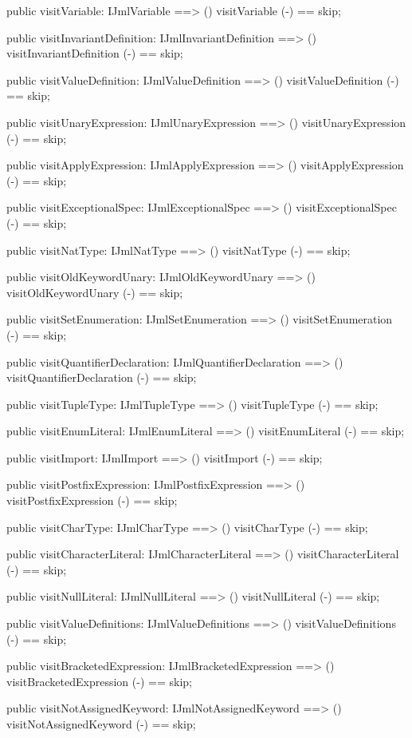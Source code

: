 \begin{vdm_al}
  public visitVariable: IJmlVariable ==> ()
  visitVariable (-) == skip;

  public visitInvariantDefinition: IJmlInvariantDefinition ==> ()
  visitInvariantDefinition (-) == skip;

  public visitValueDefinition: IJmlValueDefinition ==> ()
  visitValueDefinition (-) == skip;

  public visitUnaryExpression: IJmlUnaryExpression ==> ()
  visitUnaryExpression (-) == skip;

  public visitApplyExpression: IJmlApplyExpression ==> ()
  visitApplyExpression (-) == skip;

  public visitExceptionalSpec: IJmlExceptionalSpec ==> ()
  visitExceptionalSpec (-) == skip;

  public visitNatType: IJmlNatType ==> ()
  visitNatType (-) == skip;

  public visitOldKeywordUnary: IJmlOldKeywordUnary ==> ()
  visitOldKeywordUnary (-) == skip;

  public visitSetEnumeration: IJmlSetEnumeration ==> ()
  visitSetEnumeration (-) == skip;

  public visitQuantifierDeclaration: IJmlQuantifierDeclaration ==> ()
  visitQuantifierDeclaration (-) == skip;

  public visitTupleType: IJmlTupleType ==> ()
  visitTupleType (-) == skip;

  public visitEnumLiteral: IJmlEnumLiteral ==> ()
  visitEnumLiteral (-) == skip;

  public visitImport: IJmlImport ==> ()
  visitImport (-) == skip;

  public visitPostfixExpression: IJmlPostfixExpression ==> ()
  visitPostfixExpression (-) == skip;

  public visitCharType: IJmlCharType ==> ()
  visitCharType (-) == skip;

  public visitCharacterLiteral: IJmlCharacterLiteral ==> ()
  visitCharacterLiteral (-) == skip;

  public visitNullLiteral: IJmlNullLiteral ==> ()
  visitNullLiteral (-) == skip;

  public visitValueDefinitions: IJmlValueDefinitions ==> ()
  visitValueDefinitions (-) == skip;

  public visitBracketedExpression: IJmlBracketedExpression ==> ()
  visitBracketedExpression (-) == skip;

  public visitNotAssignedKeyword: IJmlNotAssignedKeyword ==> ()
  visitNotAssignedKeyword (-) == skip;


\end{vdm_al}
